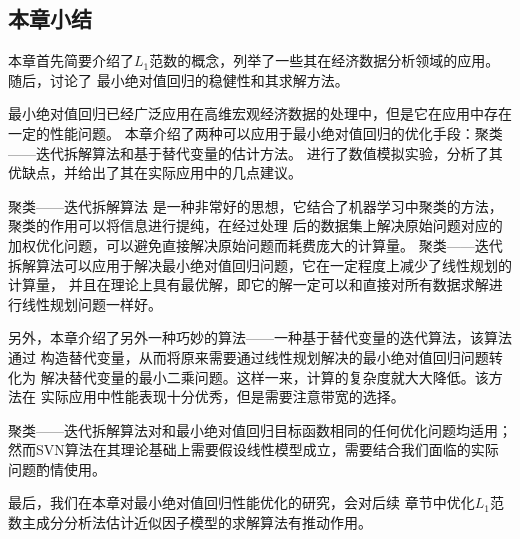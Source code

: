 \subsection{本章小结}

本章首先简要介绍了$L_1$范数的概念，列举了一些其在经济数据分析领域的应用。随后，讨论了
最小绝对值回归的稳健性和其求解方法。

最小绝对值回归已经广泛应用在高维宏观经济数据的处理中，但是它在应用中存在一定的性能问题。
本章介绍了两种可以应用于最小绝对值回归的优化手段：聚类——迭代拆解算法和基于替代变量的估计方法。
进行了数值模拟实验，分析了其优缺点，并给出了其在实际应用中的几点建议。

聚类——迭代拆解算法
是一种非常好的思想，它结合了机器学习中聚类的方法，聚类的作用可以将信息进行提纯，在经过处理
后的数据集上解决原始问题对应的加权优化问题，可以避免直接解决原始问题而耗费庞大的计算量。
聚类——迭代拆解算法可以应用于解决最小绝对值回归问题，它在一定程度上减少了线性规划的计算量，
并且在理论上具有最优解，即它的解一定可以和直接对所有数据求解进行线性规划问题一样好。

另外，本章介绍了另外一种巧妙的算法——一种基于替代变量的迭代算法，该算法通过
构造替代变量，从而将原来需要通过线性规划解决的最小绝对值回归问题转化为
解决替代变量的最小二乘问题。这样一来，计算的复杂度就大大降低。该方法在
实际应用中性能表现十分优秀，但是需要注意带宽的选择。

聚类——迭代拆解算法对和最小绝对值回归目标函数相同的任何优化问题均适用；
然而SVN算法在其理论基础上需要假设线性模型成立，需要结合我们面临的实际问题酌情使用。

最后，我们在本章对最小绝对值回归性能优化的研究，会对后续
章节中优化$L_1$范数主成分分析法估计近似因子模型的求解算法有推动作用。
